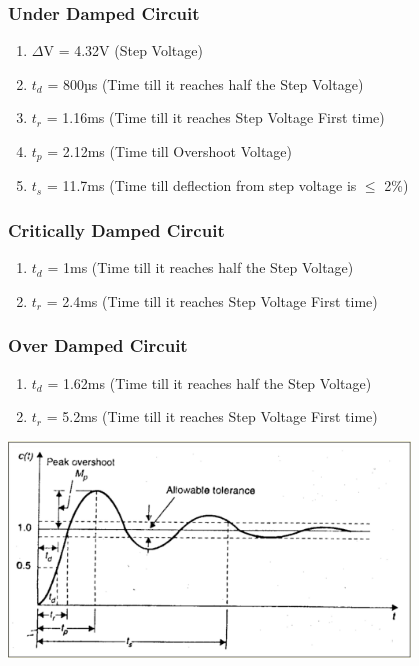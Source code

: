 \documentclass{article}
\begin{document}
\subsubsection{Under Damped Circuit}
\begin{enumerate}
    \item $\Delta$V = 4.32V (Step Voltage)
    \item $t_{d}$ = 800µs (Time till it reaches half the Step Voltage)
    \item $t_{r}$ = 1.16ms (Time till it reaches Step Voltage First time)
    \item $t_{p}$ = 2.12ms (Time till Overshoot Voltage)
    \item $t_{s}$ = 11.7ms (Time till deflection from step voltage is $\leqslant$ 2\%)
\end{enumerate}
\subsubsection{Critically Damped Circuit}
\begin{enumerate}
    \item $t_{d}$ = 1ms (Time till it reaches half the Step Voltage)
    \item $t_{r}$ = 2.4ms (Time till it reaches Step Voltage First time)
\end{enumerate}
\subsubsection{Over Damped Circuit}
\begin{enumerate}
    \item $t_{d}$ = 1.62ms (Time till it reaches half the Step Voltage)
    \item $t_{r}$ = 5.2ms (Time till it reaches Step Voltage First time)
\end{enumerate}
\begin{center}
    \includegraphics[width=0.8\textwidth]{i9.png}
\end{center}
\end{document}
